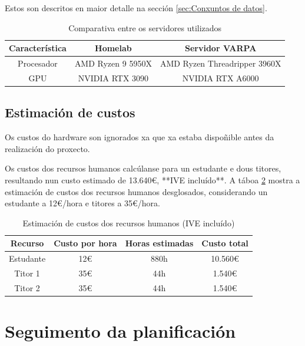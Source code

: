 Estos son descritos en maior detalle na sección \ref{sec:Conxuntos de datos}.

\begin{table}[h]
\centering
\begin{tabular}{|c|c|c|}
\hline
\textbf{Característica} & \textbf{Homelab} & \textbf{Servidor VARPA} \\ \hline
Procesador & AMD Ryzen 9 5950X&  AMD Ryzen Threadripper 3960X \\ \hline
GPU & NVIDIA RTX 3090 & NVIDIA RTX A6000  \\ \hline
\end{tabular}
\caption{Comparativa entre os servidores utilizados}
\label{tab:comparativa_servidores}
\end{table}


\subsection{Estimación de custos}
\label{subsec:Estimación de custos}

Os custos do hardware son ignorados xa que xa estaba dispoñible antes da realización do proxecto.

Os custos dos recursos humanos calcúlanse para un estudante e dous titores, resultando nun custo estimado de 13.640€, **IVE incluído**. A táboa \ref{tab:estimacion_custos} mostra a estimación de custos dos recursos humanos desglosados, considerando un estudante a 12€/hora e titores a 35€/hora.

\begin{table}[h]
\centering
\begin{tabular}{|c|c|c|c|}
\hline
\textbf{Recurso} & \textbf{Custo por hora} & \textbf{Horas estimadas} & \textbf{Custo total} \\ \hline
Estudante & 12€ & 880h & 10.560€ \\ \hline
Titor 1 & 35€ & 44h & 1.540€ \\ \hline
Titor 2 & 35€ & 44h & 1.540€ \\ \hline
\end{tabular}
\caption{Estimación de custos dos recursos humanos (IVE incluído)}
\label{tab:estimacion_custos}
\end{table}

\section{Seguimento da planificación}
\label{sec:Seguimento da planificación}

